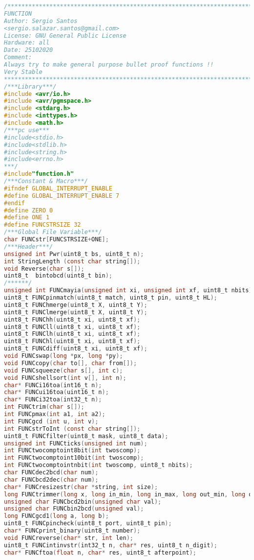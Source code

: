 \begin{lstlisting}[language=C, caption={function.c}, label=function-c, captionpos=b]
/*************************************************************************
FUNCTION
Author: Sergio Santos
<sergio.salazar.santos@gmail.com> 
License: GNU General Public License
Hardware: all
Date: 25102020
Comment:
Always try to make general purpose bullet proof functions !!
Very Stable
*************************************************************************/
/***Library***/
#include <avr/io.h>
#include <avr/pgmspace.h>
#include <stdarg.h>
#include <inttypes.h>
#include <math.h>
/***pc use***
#include<stdio.h>
#include<stdlib.h>
#include<string.h>
#include<errno.h>
***/
#include"function.h"
/***Constant & Macro***/
#ifndef GLOBAL_INTERRUPT_ENABLE
#define GLOBAL_INTERRUPT_ENABLE 7
#endif
#define ZERO 0
#define ONE 1
#define FUNCSTRSIZE 32
/***Global File Variable***/
char FUNCstr[FUNCSTRSIZE+ONE];
/***Header***/
unsigned int Pwr(uint8_t bs, uint8_t n);
int StringLength (const char string[]);
void Reverse(char s[]);
uint8_t  bintobcd(uint8_t bin);
/******/
unsigned int FUNCmayia(unsigned int xi, unsigned int xf, uint8_t nbits);
uint8_t FUNCpinmatch(uint8_t match, uint8_t pin, uint8_t HL);
uint8_t FUNChmerge(uint8_t X, uint8_t Y);
uint8_t FUNClmerge(uint8_t X, uint8_t Y);
uint8_t FUNChh(uint8_t xi, uint8_t xf);
uint8_t FUNCll(uint8_t xi, uint8_t xf);
uint8_t FUNClh(uint8_t xi, uint8_t xf);
uint8_t FUNChl(uint8_t xi, uint8_t xf);
uint8_t FUNCdiff(uint8_t xi, uint8_t xf);
void FUNCswap(long *px, long *py);
void FUNCcopy(char to[], char from[]);
void FUNCsqueeze(char s[], int c);
void FUNCshellsort(int v[], int n);
char* FUNCi16toa(int16_t n);
char* FUNCui16toa(uint16_t n);
char* FUNCi32toa(int32_t n);
int FUNCtrim(char s[]);
int FUNCpmax(int a1, int a2);
int FUNCgcd (int u, int v);
int FUNCstrToInt (const char string[]);
uint8_t FUNCfilter(uint8_t mask, uint8_t data);
unsigned int FUNCticks(unsigned int num);
int FUNCtwocomptoint8bit(int twoscomp);
int FUNCtwocomptoint10bit(int twoscomp);
int FUNCtwocomptointnbit(int twoscomp, uint8_t nbits);
char FUNCdec2bcd(char num);
char FUNCbcd2dec(char num);
char* FUNCresizestr(char *string, int size);
long FUNCtrimmer(long x, long in_min, long in_max, long out_min, long out_max);
unsigned char FUNCbcd2bin(unsigned char val);
unsigned char FUNCbin2bcd(unsigned val);
long FUNCgcd1(long a, long b);
uint8_t FUNCpincheck(uint8_t port, uint8_t pin);
char* FUNCprint_binary(uint8_t number);
void FUNCreverse(char* str, int len);
uint8_t FUNCintinvstr(int32_t n, char* res, uint8_t n_digit);
char* FUNCftoa(float n, char* res, uint8_t afterpoint);

\end{lstlisting}
